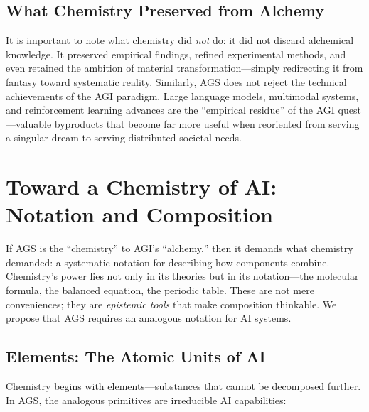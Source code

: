 \documentclass[12pt]{article}
\begin{document}
\subsection{What Chemistry Preserved from Alchemy}
\label{sec:preserved}

It is important to note what chemistry did \emph{not} do: it did not discard alchemical knowledge. It preserved empirical findings, refined experimental methods, and even retained the ambition of material transformation---simply redirecting it from fantasy toward systematic reality. Similarly, AGS does not reject the technical achievements of the AGI paradigm. Large language models, multimodal systems, and reinforcement learning advances are the ``empirical residue'' of the AGI quest---valuable byproducts that become far more useful when reoriented from serving a singular dream to serving distributed societal needs.

\section{Toward a Chemistry of AI: Notation and Composition}
\label{sec:notation}

If AGS is the ``chemistry'' to AGI's ``alchemy,'' then it demands what chemistry demanded: a systematic notation for describing how components combine. Chemistry's power lies not only in its theories but in its notation---the molecular formula, the balanced equation, the periodic table. These are not mere conveniences; they are \emph{epistemic tools} that make composition thinkable. We propose that AGS requires an analogous notation for AI systems.

\subsection{Elements: The Atomic Units of AI}
\label{sec:elements}

Chemistry begins with elements---substances that cannot be decomposed further. In AGS, the analogous primitives are irreducible AI capabilities:
\end{document}
